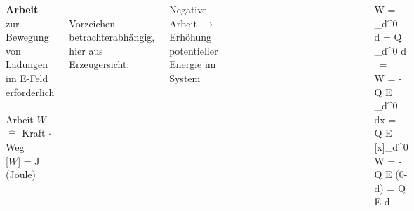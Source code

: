 \begin{frame}
{\begin{columns}
		


		\textbf{Arbeit} zur Bewegung von Ladungen im E-Feld erforderlich \\

		\phantom{.}\\
		
		Arbeit $W$ $\widehat{=}$ Kraft $\cdot$ Weg\\

		[$W$] = J (Joule)

		
		\phantom{.}\\

		Vorzeichen betrachterabhängig, hier aus Erzeugersicht:

		Negative Arbeit $\rightarrow$ Erhöhung potentieller Energie im System





	\begin{columns}



	\begin{figure}[h!]
		\centering
		
	\end{figure}




	\begin{figure}[h!]
		\centering
		
	\end{figure}


		
		\end{columns}		

		\pause





		\begin{eqa}
			W = \int_{d}^{0}   \, d  =  Q \int_{d}^{0}  \cdot d \\
			 \,  = \\
			 W = -Q \cdot E \int_{d}^{0} dx = -Q \cdot E \, [x]_d^0 \\
			 W = -Q \cdot E (0-d) = Q \cdot E \cdot d
		\end{eqa}



\end{columns}}
\end{frame}
